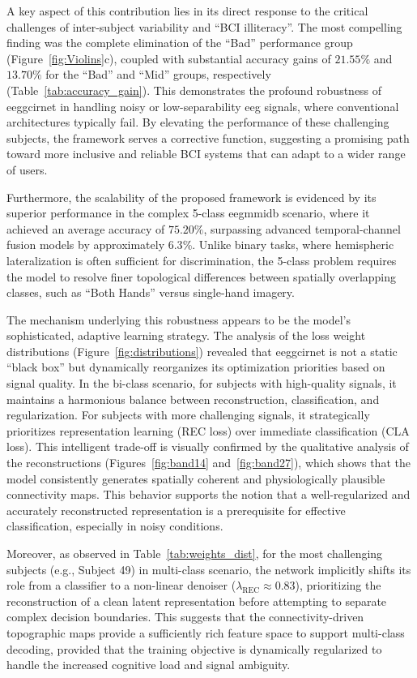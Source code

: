 {A key aspect of this contribution} lies in its direct response to the critical challenges of inter-subject variability and ``BCI illiteracy''. The most compelling finding was the complete elimination of the ``Bad'' performance group (Figure~\ref{fig:Violins}c), coupled with substantial accuracy gains of $21.55\%$ and $13.70\%$ for the ``Bad'' and ``Mid'' groups, respectively (Table~\ref{tab:accuracy_gain}). This demonstrates the profound robustness of \gls{eeggcirnet} in handling noisy or low-separability \gls{eeg} signals, where conventional architectures typically fail. By elevating the performance of these challenging subjects, the framework serves a corrective function, suggesting a promising path toward more inclusive and reliable BCI systems that can adapt to a wider range of users. {Furthermore, the scalability of the proposed framework is evidenced by its superior performance in the complex 5-class \gls{eegmmidb} scenario, where it achieved an average accuracy of $75.20\%$, surpassing advanced temporal-channel fusion models by approximately $6.3$\%. Unlike binary tasks, where hemispheric lateralization is often sufficient for discrimination, the 5-class problem requires the model to resolve finer topological differences between spatially overlapping classes, such as ``Both Hands'' versus single-hand imagery.

The mechanism underlying this robustness appears to be the model's sophisticated, adaptive learning strategy. The analysis of the loss weight distributions (Figure~\ref{fig:distributions}) revealed that \gls{eeggcirnet} is not a static ``black box'' but dynamically reorganizes its optimization priorities based on signal quality. In the bi-class scenario, for subjects with high-quality signals, it maintains a harmonious balance between reconstruction, classification, and regularization. For subjects with more challenging signals, it strategically prioritizes representation learning (REC loss) over immediate classification (CLA loss). This intelligent trade-off is visually confirmed by the qualitative analysis of the reconstructions (Figures~\ref{fig:band14} and~\ref{fig:band27}), which shows that the model consistently generates spatially coherent and physiologically plausible connectivity maps. This behavior supports the notion that a well-regularized and accurately reconstructed representation is a prerequisite for effective classification, especially in noisy conditions. {Moreover, as observed in Table~\ref{tab:weights_dist}, for the most challenging subjects (e.g., Subject 49) in multi-class scenario, the network implicitly shifts its role from a classifier to a non-linear denoiser ($\lambda_{\text{REC}} \approx 0.83$), prioritizing the reconstruction of a clean latent representation before attempting to separate complex decision boundaries. This suggests that the connectivity-driven topographic maps provide a sufficiently rich feature space to support multi-class decoding, provided that the training objective is dynamically regularized to handle the increased cognitive load and signal ambiguity.

}}
